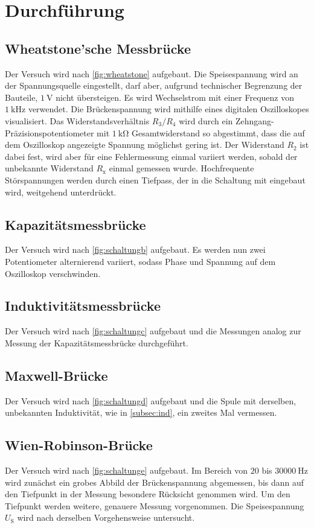 \section{Durchführung}
\label{sec:Durchführung}

\subsection{Wheatstone'sche  Messbrücke}
Der Versuch wird nach \autoref{fig:wheatstone} aufgebaut. Die Speisespannung wird an der Spannungsquelle eingestellt, 
darf aber, aufgrund technischer Begrenzung der Bauteile, $\SI{1}{\volt}$ nicht übersteigen. Es wird Wechselstrom mit
einer Frequenz von $\SI{1}{\kilo\hertz}$ verwendet. Die Brückenspannung wird mithilfe eines digitalen Oszilloskopes 
visualisiert. Das Widerstandsverhältnis $R_3/R_4$ wird durch ein Zehngang-Präzisionspotentiometer mit $\SI{1}{\kilo\ohm}$ 
Gesamtwiderstand so abgestimmt, dass die auf dem Oszilloskop angezeigte Spannung möglichst gering ist. Der Widerstand 
$R_2$ ist dabei fest, wird aber für eine Fehlermessung einmal variiert werden, sobald der unbekannte Widerstand 
$R_{\text{x}}$ einmal gemessen wurde. Hochfrequente Störspannungen werden durch einen Tiefpass, der in die Schaltung 
mit eingebaut wird, weitgehend unterdrückt.

\subsection{Kapazitätsmessbrücke}
Der Versuch wird nach \autoref{fig:schaltungb} aufgebaut. Es werden nun zwei Potentiometer alternierend variiert, sodass
Phase und Spannung auf dem Oszilloskop verschwinden. 

\subsection{Induktivitätsmessbrücke}
\label{subsec:ind}
Der Versuch wird nach \autoref{fig:schaltungc} aufgebaut und die Messungen analog zur Messung der Kapazitätsmessbrücke durchgeführt.

\subsection{Maxwell-Brücke}
Der Versuch wird nach \autoref{fig:schaltungd} aufgebaut und die Spule mit derselben, unbekannten Induktivität, wie in \autoref{subsec:ind},
ein zweites Mal vermessen.

\subsection{Wien-Robinson-Brücke}
Der Versuch wird nach \autoref{fig:schaltunge} aufgebaut.
Im Bereich von $20$ bis $\SI{30 000}{\hertz}$ wird zunächst ein grobes Abbild der Brückenspannung abgemessen, bis
dann auf den Tiefpunkt in der Messung besondere Rücksicht genommen wird. Um den Tiefpunkt werden weitere, genauere Messung vorgenommen.
Die Speisespannung $U_{\text{S}}$ wird nach derselben Vorgehensweise untersucht.